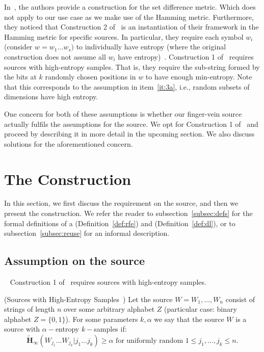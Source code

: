 In~\cite{rpi}, the authors provide a \rfe construction for the set difference metric. Which does not apply to our use case as we make use of the Hamming metric. Furthermore, they noticed that Construction 2 of~\cite{reusablefe} is an instantiation of their framework in the Hamming metric for specific sources. In particular, they require each symbol $w_i$ (consider $w=w_1 \dots w_s)$ to individually have entropy (where the original construction does not assume all $w_i$ have entropy)~\cite{rpi}.
Construction 1 of~\cite{reusablefe} requires sources with high-entropy samples. That is, they require the sub-string formed by the bits at $k$ randomly chosen positions in $w$ to have enough min-entropy. Note that this corresponds to the assumption in item~\ref{it:3a}, i.e., random subsets of dimensions have high entropy.

One concern for both of these assumptions is whether our finger-vein source actually fulfils the assumptions for the source. We opt for Construction 1 of~\cite{reusablefe} and proceed by describing it in more detail in the upcoming section. We also discuss solutions for the aforementioned concern.

\section{The Construction}\label{sec:constr}
In this section, we first discuss the requirement on the source, and then we present the construction.
We refer the reader to subsection~\ref{subsec:defs} for the formal definitions of a \rfe (Definition~\ref{def:rfe}) and \dl (Definition~\ref{def:dl}), or to subsection~\ref{subsec:reuse} for an informal description.

\subsection{Assumption on the source}~\label{subsec:asspts}
Construction 1 of~\cite{reusablefe} requires sources with high-entropy samples.

\begin{definition}{(Sources with High-Entropy Samples~\cite{reusablefe})}
Let the source $W = W_1, \dots , W_n$ consist of strings of length $n$ over some arbitrary alphabet $Z$ (particular case: binary alphabet $Z = \{0, 1\}$). For some parameters $k, \alpha$ we say that the source $W$ is a source with $\alpha-$entropy $k-$samples if:
$$\mathbf{\tilde{H}}_\infty(W_{j_1}\dots W_{j_k}|j_1 \dots j_k) \geq \alpha \text{ for uniformly random } 1\leq j_1, \dots, j_k \leq n\text{.}$$ 
\end{definition}


